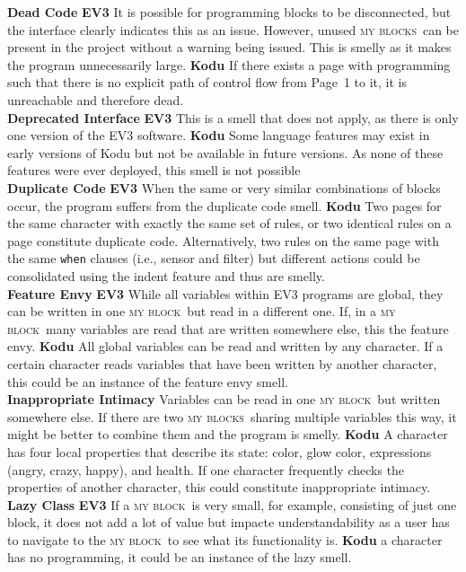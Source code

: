 \documentclass[conference]{IEEEtran}
\newcommand{\mbs}{\textsc{my blocks}}
\newcommand{\mb}{\textsc{my block}}
\begin{document}
\noindent 
\textbf{Dead Code} \textbf{EV3} It is possible for programming blocks to be disconnected, but the interface clearly indicates this as an issue. However, unused \mbs~can be present in the project without a warning being issued. This is smelly as it makes the program unnecessarily large. \textbf{Kodu} If there exists a page with programming such that there is no explicit path of control flow from Page~1 to it, it is unreachable and therefore dead.\\
\textbf{Deprecated Interface} \textbf{EV3} This is a smell that does not apply, as there is only one version of the EV3 software. \textbf{Kodu} Some language features may exist in early versions of Kodu but not be available in future versions. As none of these features were ever deployed, this smell is not possible\\
\textbf{Duplicate Code} \textbf{EV3} When the same or very similar combinations of blocks occur, the program suffers from the duplicate code smell.
\textbf{Kodu} Two pages for the same character with exactly the same set of rules, or two identical rules on a page constitute duplicate code. Alternatively, two rules on the same page with the same {\tt when} clauses (i.e., sensor and filter) but different actions could be consolidated using the indent feature and thus are smelly. \\
\textbf{Feature Envy} \textbf{EV3} While all variables within EV3 programs are global, they can be written in one \mb~but read in a different one. If, in a \mb~many variables are read that are written somewhere else, this the feature envy. \textbf{Kodu} All global variables can be read and written by any character. If a certain character reads variables that have been written by another character, this could be an instance of the feature envy smell.\\
\textbf{Inappropriate Intimacy} Variables can be read in one \mb~but written somewhere else. If there are two \mbs~sharing multiple variables this way, it might be better to combine them and the program is smelly. \textbf{Kodu} A character has four local properties that describe its state: color, glow color, expressions (angry, crazy, happy), and health.  If one character frequently checks the properties of another character, this could constitute inappropriate intimacy.\\
\textbf{Lazy Class} \textbf{EV3} If a \mb~is very small, for example, consisting of just one block, it does not add a lot of value but impacte understandability as a user has to navigate to the \mb~to see what its functionality is. \textbf{Kodu}  a character has no programming, it could be an instance of the lazy smell.
\end{document}
